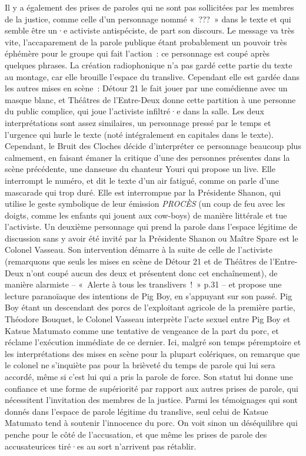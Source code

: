 \documentclass[
]{article}
\begin{document}
Il y a également des prises de paroles qui ne sont pas sollicitées par les membres de la justice, comme celle d'un personnage nommé «~???~» dans le texte et qui semble être un·e activiste antispéciste, de part son discours. Le message va très vite, l'accaparement de la parole publique étant probablement un pouvoir très éphémère pour le groupe qui fait l'action~: ce personnage est coupé après quelques phrases. La création radiophonique n'a pas gardé cette partie du texte au montage, car elle brouille l'espace du translive. Cependant elle est gardée dans les autres mises en scène~: Détour 21 le fait jouer par une comédienne avec un masque blanc, et Théâtres de l'Entre-Deux donne cette partition à une personne du public complice, qui joue l'activiste infiltré·e dans la salle. Les deux interprétations sont assez similaires, un personnage pressé par le temps et l'urgence qui hurle le texte (noté intégralement en capitales dans le texte). Cependant, le Bruit des Cloches décide d'interpréter ce personnage beaucoup plus calmement, en faisant émaner la critique d'une des personnes présentes dans la scène précédente, une danseuse du chanteur Youri qui propose un live. Elle interrompt le numéro, et dit le texte d'un air fatigué, comme on parle d'une mascarade qui trop duré. Elle est interrompue par la Présidente Shanon, qui utilise le geste symbolique de leur émission \emph{PROCÈS} (un coup de feu avec les doigts, comme les enfants qui jouent aux cow-boys) de manière littérale et tue l'activiste. Un deuxième personnage qui prend la parole dans l'espace légitime de discussion sans y avoir été invité par la Présidente Shanon ou Maître Spare est le Colonel Vasseau. Son intervention démarre à la suite de celle de l'activiste (remarquons que seuls les mises en scène de Détour 21 et de Théâtres de l'Entre-Deux n'ont coupé aucun des deux et présentent donc cet enchaînement), de manière alarmiste -- «~Alerte à tous les translivers~!~» p.31 -- et propose une lecture paranoïaque des intentions de Pig Boy, en s'appuyant sur son passé. Pig Boy étant un descendant des porcs de l'exploitant agricole de la première partie, Théodore Bouquet, le Colonel Vasseau interprète l'acte sexuel entre Pig Boy et Katsue Matumato comme une tentative de vengeance de la part du porc, et réclame l'exécution immédiate de ce dernier. Ici, malgré son temps péremptoire et les interprétations des mises en scène pour la plupart colériques, on remarque que le colonel ne s'inquiète pas pour la brièveté du temps de parole qui lui sera accordé, même si c'est lui qui a pris la parole de force. Son statut lui donne une confiance et une forme de supériorité par rapport aux autres prises de parole, qui nécessitent l'invitation des membres de la justice. Parmi les témoignages qui sont donnés dans l'espace de parole légitime du translive, seul celui de Katsue Matumato tend à soutenir l'innocence du porc. On voit sinon un déséquilibre qui penche pour le côté de l'accusation, et que même les prises de parole des accusateurices tiré·es au sort n'arrivent pas rétablir.
\end{document}
